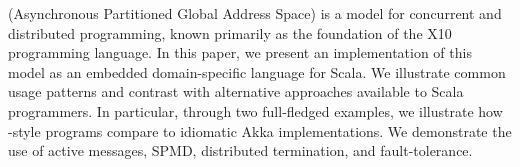 \apgas (Asynchronous Partitioned Global Address Space) is a model for
concurrent and distributed programming, known primarily as the foundation of
the X10 programming language. In this paper, we present an implementation of
this model as an embedded domain-specific language for Scala. We illustrate
common usage patterns and contrast with alternative approaches available to
Scala programmers. In particular, through two full-fledged examples, we
illustrate how \apgas-style programs compare to idiomatic Akka implementations.
We demonstrate the use of active messages, SPMD, distributed termination, and
fault-tolerance.
